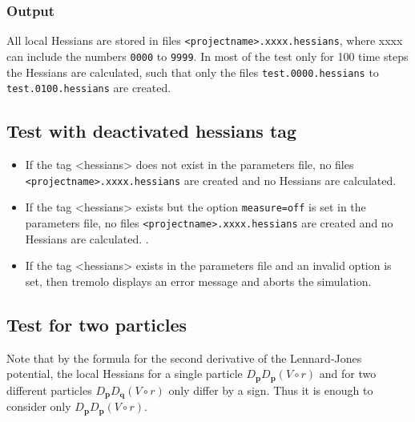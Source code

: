 \documentclass[a4paper]{article}
\newcommand{\boldp}{\boldsymbol{p}}
\newcommand{\boldq}{\boldsymbol{q}}
\begin{document}
\subsubsection{Output}
\label{sec-1-2-2}
All local Hessians are stored in files \texttt{<projectname>.xxxx.hessians}, where xxxx can include the numbers \texttt{0000} to \texttt{9999}.
In most of the test only for 100 time steps the Hessians are calculated, such that only the files \texttt{test.0000.hessians} to \texttt{test.0100.hessians} are created.

\subsection{Test with deactivated hessians tag}
\label{sec-1-3}
\begin{itemize}
\item If the tag <hessians> does not exist in the parameters file, no files \texttt{<projectname>.xxxx.hessians} are created and no Hessians are calculated.
\item If the tag <hessians> exists but the option \texttt{measure=off} is set in the parameters file, no files \texttt{<projectname>.xxxx.hessians} are created and no Hessians are calculated. .
\item If the tag <hessians> exists in the parameters file and an invalid option is set, then tremolo displays an error message and aborts the simulation.
\end{itemize}

\subsection{Test for two particles}
\label{sec-1-4}
Note that by the formula for the second derivative of the Lennard-Jones potential, the local Hessians for a single particle \(D_{\boldp}D_{\boldp} (V\circ r)\) and for two different particles \(D_{\boldp}D_{\boldq} (V\circ r)\) only differ by a sign.
Thus it is enough to consider only \(D_{\boldp}D_{\boldp} (V\circ r)\).
\end{document}
